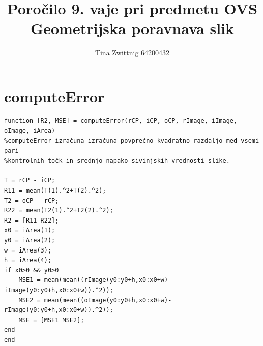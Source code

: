 \documentclass[12pt,a4paper]{article}
\author{Tina Zwittnig 64200432}
\title{Poročilo 9. vaje pri predmetu OVS \\ Geometrijska poravnava slik}
\begin{document}
\maketitle
\pagebreak
\section{computeError}
\begin{verbatim}
function [R2, MSE] = computeError(rCP, iCP, oCP, rImage, iImage, oImage, iArea)
%computeError izračuna izračuna povprečno kvadratno razdaljo med vsemi pari
%kontrolnih točk in srednjo napako sivinjskih vrednosti slike. 

T = rCP - iCP;
R11 = mean(T(1).^2+T(2).^2);
T2 = oCP - rCP;
R22 = mean(T2(1).^2+T2(2).^2);
R2 = [R11 R22];
x0 = iArea(1);
y0 = iArea(2);
w = iArea(3);
h = iArea(4);
if x0>0 && y0>0
    MSE1 = mean(mean((rImage(y0:y0+h,x0:x0+w)-iImage(y0:y0+h,x0:x0+w)).^2));
    MSE2 = mean(mean((oImage(y0:y0+h,x0:x0+w)-rImage(y0:y0+h,x0:x0+w)).^2));
    MSE = [MSE1 MSE2];
end
end
\end{verbatim}
\end{document}
